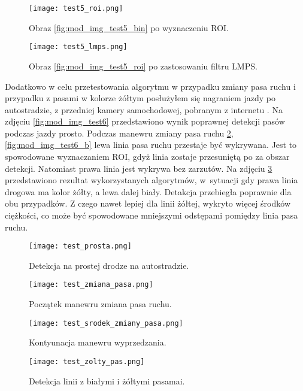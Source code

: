 \begin{figure}
	\begin{minipage}{0.48\textwidth}
		\centering
		\texttt{[image: test5\_roi.png]}
		\caption{Obraz \ref{fig:mod_img_test5_bin} po wyznaczeniu ROI.}
		\label{fig:mod_img_test5_roi}
	\end{minipage}
	\begin{minipage}{0.48\textwidth}
		\centering
		\texttt{[image: test5\_lmps.png]}
		\caption{Obraz \ref{fig:mod_img_test5_roi} po zastosowaniu filtru LMPS.}
		\label{fig:mod_img_test5_lmps}
	\end{minipage}
\end{figure}

Dodatkowo w celu przetestowania algorytmu w przypadku zmiany pasa ruchu i przypadku z pasami w kolorze żółtym posłużyłem się nagraniem jazdy po autostradzie, z przedniej kamery samochodowej, pobranym z internetu \cite{youtube_mat}.
Na zdjęciu \ref{fig:mod_img_test6} przedstawiono wynik poprawnej detekcji pasów podczas jazdy prosto.
Podczas manewru zmiany pasa ruchu \ref{fig:mod_img_test6_a}, \ref{fig:mod_img_test6_b} lewa linia pasa ruchu przestaje być wykrywana. Jest to spowodowane wyznaczaniem ROI, gdyż linia zostaje przesuniętą po za obszar detekcji. Natomiast prawa linia jest wykrywa bez zarzutów.
Na zdjęciu \ref{fig:mod_img_test6_c} przedstawiono rezultat wykorzystanych algorytmów, w~sytuacji gdy prawa linia  drogowa ma kolor żółty, a lewa dalej biały.
Detakcja przebiegła poprawnie dla obu przypadków. Z czego nawet lepiej dla linii żółtej, wykryto więcej środków ciężkości, co może być spowodowane mniejszymi odstępami pomiędzy linia pasa ruchu.

\begin{figure}
	\begin{minipage}{0.48\textwidth}
		\centering
		\texttt{[image: test\_prosta.png]}
		\caption{Detekcja na prostej drodze na autostradzie.}
		\label{fig:mod_img_test6}
	\end{minipage}
	\begin{minipage}{0.48\textwidth}
		\centering
		\texttt{[image: test\_zmiana\_pasa.png]}
		\caption{Początek manewru zmiana pasa ruchu.}
		\label{fig:mod_img_test6_a}
	\end{minipage}
\end{figure}
\begin{figure}
	\begin{minipage}{0.48\textwidth}
		\centering
		\texttt{[image: test\_srodek\_zmiany\_pasa.png]}
		\caption{Kontyunacja manewru wyprzedzania.}
		\label{fig:mod_img_test6_b}
	\end{minipage}
	\begin{minipage}{0.48\textwidth}
		\centering
		\texttt{[image: test\_zolty\_pas.png]}
		\caption{Detekcja linii z białymi i żółtymi pasamai.}
		\label{fig:mod_img_test6_c}
	\end{minipage}
\end{figure}

